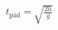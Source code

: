\documentclass[preview]{standalone}
\begin{document}
\begin{align*}
t_{\text{pád}}  =  \sqrt {\frac{2h}{g}}
\end{align*}
\end{document}
